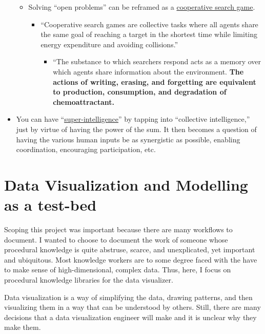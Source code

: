 \documentclass[
]{article}
\providecommand{\tightlist}{%
  \setlength{\itemsep}{0pt}\setlength{\parskip}{0pt}}\usepackage{longtable,booktabs,array}
\begin{document}
\begin{itemize}
  \begin{itemize}
  \item
    Solving ``open problems'' can be reframed as a
    \href{https://arxiv.org/pdf/1801.02965}{cooperative search game}.

    \begin{itemize}
    \item
      ``Cooperative search games are collective tasks where all agents
      share the same goal of reaching a target in the shortest time
      while limiting energy expenditure and avoiding collisions.''

      \begin{itemize}
      \tightlist
      \item
        ``The substance to which searchers respond acts as a memory over
        which agents share information about the environment.
        \textbf{The actions of writing, erasing, and forgetting are
        equivalent to production, consumption, and degradation of
        chemoattractant.}
      \end{itemize}
    \end{itemize}
  \end{itemize}
\item
  You can have
  ``\href{https://www.theatlantic.com/sponsored/google/beyond-the-brain/3944/}{super-intelligence}''
  by tapping into ``collective intelligence,'' just by virtue of having
  the power of the sum. It then becomes a question of having the various
  human inputs be as synergistic as possible, enabling coordination,
  encouraging participation, etc.
\end{itemize}

\section{Data Visualization and Modelling as a
test-bed}\label{data-visualization-and-modelling-as-a-test-bed}

Scoping this project was important because there are many workflows to
document. I wanted to choose to document the work of someone whose
procedural knowledge is quite abstruse, scarce, and unexplicated, yet
important and ubiquitous. Most knowledge workers are to some degree
faced with the have to make sense of high-dimensional, complex data.
Thus, here, I focus on procedural knowledge libraries for the data
visualizer.

Data visualization is a way of simplifying the data, drawing patterns,
and then visualizing them in a way that can be understood by others.
Still, there are many decisions that a data visualization engineer will
make and it is unclear why they make them.
\end{document}
